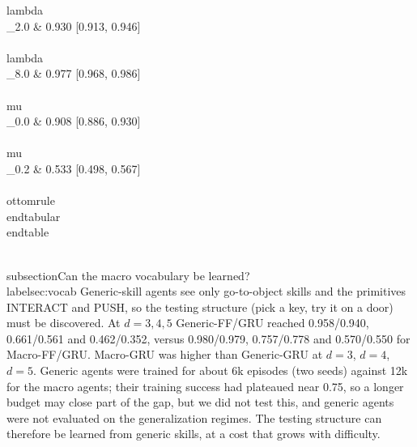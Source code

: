 \documentclass[runningheads]{llncs}
\begin{document}
{{lambda\\_2.0 & 0.930 [0.913, 0.946] \\\\
lambda\\_8.0 & 0.977 [0.968, 0.986] \\\\
mu\\_0.0 & 0.908 [0.886, 0.930] \\\\
mu\\_0.2 & 0.533 [0.498, 0.567] \\\\
\ottomrule
\\end{tabular}
\\end{table}

\\subsection{Can the macro vocabulary be learned?}\\label{sec:vocab}
Generic-skill agents see only go-to-object skills and the primitives INTERACT and PUSH, so the testing structure (pick a key, try it on a door) must be discovered. At $d=3,4,5$ Generic-FF/GRU reached 0.958/0.940, 0.661/0.561 and 0.462/0.352, versus 0.980/0.979, 0.757/0.778 and 0.570/0.550 for Macro-FF/GRU. Macro-GRU was higher than Generic-GRU at $d=3$, $d=4$, $d=5$. Generic agents were trained for about 6k episodes (two seeds) against 12k for the macro agents; their training success had plateaued near 0.75, so a longer budget may close part of the gap, but we did not test this, and generic agents were not evaluated on the generalization regimes. The testing structure can therefore be learned from generic skills, at a cost that grows with difficulty.

}}
\end{document}
